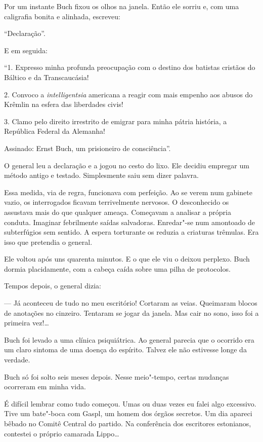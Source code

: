 Por um instante Buch fixou os olhos na janela. Então ele sorriu e, com
uma caligrafia bonita e alinhada, escreveu:

``Declaração''.

E em seguida:

``1. Expresso minha profunda preocupação com o destino dos batistas
cristãos do Báltico e da Transcaucásia!

2. Convoco a \emph{intelligentsia} americana a reagir com mais empenho
aos abusos do Krêmlin na esfera das liberdades civis!

3. Clamo pelo direito irrestrito de emigrar para minha pátria história,
a República Federal da Alemanha!

Assinado: Ernst Buch, um prisioneiro de consciência''.

O general leu a declaração e a jogou no cesto do lixo. Ele decidiu
empregar um método antigo e testado. Simplesmente saiu sem dizer
palavra.

Essa medida, via de regra, funcionava com perfeição. Ao se verem num
gabinete vazio, os interrogados ficavam terrivelmente nervosos. O
desconhecido os assustava mais do que qualquer ameaça. Começavam a
analisar a própria conduta. Imaginar febrilmente saídas salvadoras.
Enredar"-se num amontoado de subterfúgios sem sentido. A espera
torturante os reduzia a criaturas trêmulas. Era isso que pretendia o
general.

Ele voltou após uns quarenta minutos. E o que ele viu o deixou perplexo.
Buch dormia placidamente, com a cabeça caída sobre uma pilha de
protocolos.

Tempos depois, o general dizia:

--- Já aconteceu de tudo no meu escritório! Cortaram as veias. Queimaram
blocos de anotações no cinzeiro. Tentaram se jogar da janela. Mas cair
no sono, isso foi a primeira vez!\ldots{}

Buch foi levado a uma clínica psiquiátrica. Ao general parecia que o
ocorrido era um claro sintoma de uma doença do espírito. Talvez ele não
estivesse longe da verdade.

Buch só foi solto seis meses depois. Nesse meio"-tempo, certas mudanças
ocorreram em minha vida.

É difícil lembrar como tudo começou. Umas ou duas vezes eu falei algo
excessivo. Tive um bate"-boca com Gaspl, um homem dos órgãos secretos. Um
dia apareci bêbado no Comitê Central do partido. Na conferência dos
escritores estonianos, contestei o próprio camarada Lippo\ldots{}

